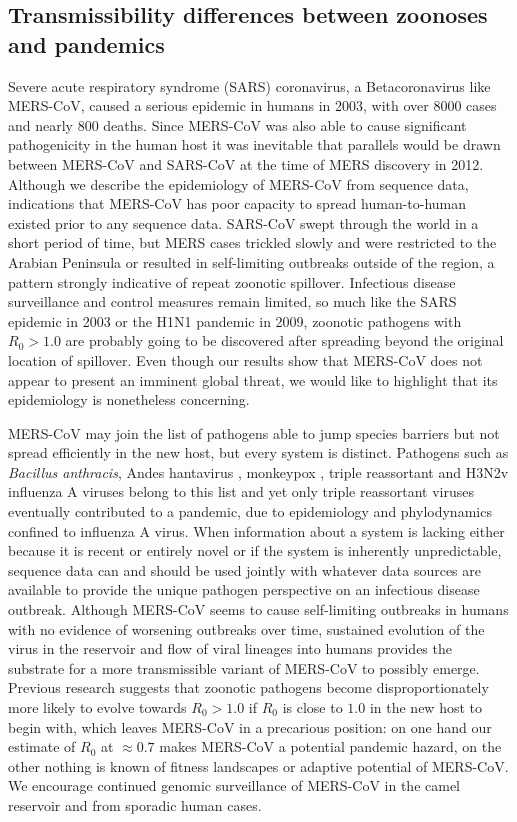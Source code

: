 \documentclass[11pt,oneside,letterpaper]{article}
\begin{document}
\subsection*{Transmissibility differences between zoonoses and pandemics}
Severe acute respiratory syndrome (SARS) coronavirus, a Betacoronavirus like MERS-CoV, caused a serious epidemic in humans in 2003, with over 8000 cases and nearly 800 deaths.
Since MERS-CoV was also able to cause significant pathogenicity in the human host it was inevitable that parallels would be drawn between MERS-CoV and SARS-CoV at the time of MERS discovery in 2012.
Although we describe the epidemiology of MERS-CoV from sequence data, indications that MERS-CoV has poor capacity to spread human-to-human existed prior to any sequence data.
SARS-CoV swept through the world in a short period of time, but MERS cases trickled slowly and were restricted to the Arabian Peninsula or resulted in self-limiting outbreaks outside of the region, a pattern strongly indicative of repeat zoonotic spillover.
Infectious disease surveillance and control measures remain limited, so much like the SARS epidemic in 2003 or the H1N1 pandemic in 2009, zoonotic pathogens with $R_{0}>1.0$ are probably going to be discovered after spreading beyond the original location of spillover.
Even though our results show that MERS-CoV does not appear to present an imminent global threat, we would like to highlight that its epidemiology is nonetheless concerning.

MERS-CoV may join the list of pathogens able to jump species barriers but not spread efficiently in the new host, but every system is distinct.
Pathogens such as \textit{Bacillus anthracis}, Andes hantavirus \citep{martinez_person--person_2005}, monkeypox \citep{reed_detection_2004}, triple reassortant and H3N2v influenza A viruses \citep{shinde_triple-reassortant_2009,epperson_human_2013} belong to this list and yet only triple reassortant viruses eventually contributed to a pandemic, due to epidemiology and phylodynamics confined to influenza A virus.
When information about a system is lacking either because it is recent or entirely novel or if the system is inherently unpredictable, sequence data can and should be used jointly with whatever data sources are available to provide the unique pathogen perspective on an infectious disease outbreak.
Although MERS-CoV seems to cause self-limiting outbreaks in humans with no evidence of worsening outbreaks over time, sustained evolution of the virus in the reservoir and flow of viral lineages into humans provides the substrate for a more transmissible variant of MERS-CoV to possibly emerge.
Previous research \citep{antia_role_2003} suggests that zoonotic pathogens become disproportionately more likely to evolve towards $R_{0}>1.0$ if $R_{0}$ is close to $1.0$ in the new host to begin with, which leaves MERS-CoV in a precarious position: on one hand our estimate of $R_{0}$ at $\approx 0.7$ makes MERS-CoV a potential pandemic hazard, on the other nothing is known of fitness landscapes or adaptive potential of MERS-CoV.
We encourage continued genomic surveillance of MERS-CoV in the camel reservoir and from sporadic human cases.
\end{document}
